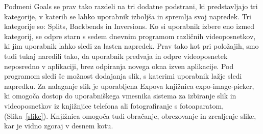 \documentclass[a4paper, 12pt]{book}
\begin{document}
Podmeni Goals se prav tako razdeli na tri dodatne podstrani, ki predstavljajo tri kategorije, v katerih se lahko uporabnik izboljša in spremlja svoj napredek. Tri kategorije so: Splits, Backbends in Inversions. Ko si uporabnik izbere eno izmed kategorij, se odpre starn s sedem dnevnim programom različnih videoposnetkov, ki jim uporabnik lahko sledi za lasten napredek. Prav tako kot pri položajih, smo tudi tukaj naredili tako, da uporabnik predvaja in odpre videoposnetek neposredno v aplikaciji, brez odpiranja novega okna izven aplikacije. Pod programom sledi še možnost dodajanja slik, s katerimi uporabnik lažje sledi napredku. Za nalaganje slik je  uporabljena Expova knjižnica expo-image-picker, ki omogoča dostop do uporabniškega vmesnika sistema za izbiranje slik in videoposnetkov iz knjižnjice telefona ali fotografiranje s fotoaparatom, (Slika~\ref{slike}). Knjižnica omogoča tudi obračanje, obrezovanje in zrcaljenje slike, kar je vidno zgoraj v desnem kotu.
\end{document}
